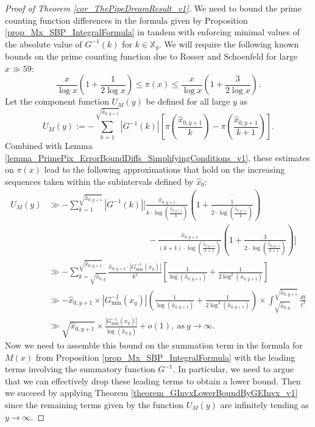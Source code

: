 \documentclass[11pt,reqno,a4letter]{article}
\numberwithin{figure}{section}
\numberwithin{table}{section}
\theoremstyle{plain}
\numberwithin{theorem}{section}
\theoremstyle{definition}
\begin{document}
\begin{proof}[Proof of Theorem \ref{cor_ThePipeDreamResult_v1}]
We need to bound the prime counting function differences in the formula given by 
Proposition \ref{prop_Mx_SBP_IntegralFormula} in tandem with enforcing minimal values of the 
absolute value of $G^{-1}(k)$ for $k \in \mathbb{X}_y$. 
We will require the following known bounds on the prime counting 
function due to Rosser and Schoenfeld \cite[Thm.\ 1]{ROSSER-SCHOENFELD-1962} 
for large $x \gg 59$: 
\begin{equation} 
\label{eqn_RosserSchoenfeld_PrimePixBounds_v2} 
\frac{x}{\log x}\left(1 + \frac{1}{2\log x}\right) \leq \pi(x) \leq 
     \frac{x}{\log x}\left(1 + \frac{3}{2 \log x}\right). 
\end{equation} 
Let the component function $U_M(y)$ be defined for all large $y$ as 
\[
U_M(y) := -\sum_{k=1}^{\sqrt{\hat{x}_{0,y+1}}} |G^{-1}(k)| \left[ 
     \pi\left(\frac{\hat{x}_{0,y+1}}{k}\right) - 
     \pi\left(\frac{\hat{x}_{0,y+1}}{k+1}\right)
     \right]. 
\]
Combined with Lemma \ref{lemma_PrimePix_ErrorBoundDiffs_SimplifyingConditions_v1}, 
these estimates on $\pi(x)$ lead to the following approximations that hold on the 
increasing sequences taken within the subintervals defined by $\widehat{x}_0$: 
\begin{align*} 
U_M(y) & \gg -\sum_{k=1}^{\sqrt{\hat{x}_{0,y+1}}} |G^{-1}(k)| \Biggl[ 
     \frac{\hat{x}_{0,y+1}}{k \cdot \log\left(\frac{\hat{x}_{0,y+1}}{k}\right)} \left(1 + 
     \frac{1}{2 \cdot \log\left(\frac{\hat{x}_{0,y+1}}{k}\right)}\right) \\ 
     & \phantom{\gg -\sum_{k=1}^{\sqrt{\hat{x}_{0,y+1}}} |G^{-1}(k)| \Biggl[\ } - 
     \frac{\hat{x}_{0,y+1}}{(k+1) \cdot \log\left(\frac{\hat{x}_{0,y+1}}{k+1}\right)} \left(1 + 
     \frac{3}{2 \cdot \log\left(\frac{\hat{x}_{0,y+1}}{k+1}\right)}\right)
     \Biggr] \\ 
     & \gg 
     -\sum_{k=\sqrt{\hat{x}_{0,y}}}^{\sqrt{\hat{x}_{0,y+1}}} \frac{\hat{x}_{0,y+1} \cdot 
     |G_{\min}^{-1}(x_y)|}{k^2} \left[ 
     \frac{1}{\log(\hat{x}_{0,y+1})} + \frac{1}{2 \log^2(\hat{x}_{0,y+1})}\right] \\ 
     & \gg -\hat{x}_{0,y+1} \times |G_{\min}^{-1}(x_y)| \left(\frac{1}{\log(\hat{x}_{0,y+1})} + 
     \frac{1}{2 \log^2(\hat{x}_{0,y+1})}\right) \times \int_{\sqrt{\hat{x}_{0,y}}}^{\sqrt{\hat{x}_{0,y+1}}} 
     \frac{dt}{t^2} \\ 
     & \gg \sqrt{\hat{x}_{0,y+1}} \times 
     \frac{|G_{\min}^{-1}(x_y)|}{\log(\hat{x}_{0,y})} 
     + o(1), \mathrm{\ as\ } y \rightarrow \infty. 
\end{align*} 
Now we need to assemble this bound on the summation term in the 
formula for $M(x)$ from 
Proposition \ref{prop_Mx_SBP_IntegralFormula} with the 
leading terms involving the summatory function $G^{-1}$. 
In particular, we need to argue that we can effectively drop these leading terms to 
obtain a lower bound. Then we succeed by applying 
Theorem \ref{theorem_GInvxLowerBoundByGEInvx_v1} since the remaining terms given by the 
function $U_M(y)$ are infinitely tending as $y \rightarrow \infty$. 


\end{proof}
\end{document}
